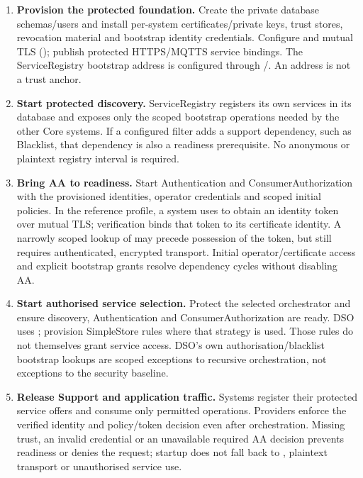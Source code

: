 \documentclass[a4paper]{arrowhead}
\newcommand{\svc}[1]{\textcolor{ArrowheadPurple}{\textit{\ahbreak{#1}}}}    %
\begin{document}
\begin{enumerate}
  \item \textbf{Provision the protected foundation.} Create the private database
        schemas/users and install per-system certificates/private keys, trust stores,
        revocation material and bootstrap identity credentials. Configure
         and mutual TLS
        (); publish protected HTTPS/MQTTS service
        bindings. The ServiceRegistry bootstrap address is configured through
        /. An address is not a trust anchor.
  \item \textbf{Start protected discovery.} ServiceRegistry registers its own services
        in its database and exposes only the scoped bootstrap operations needed by
        the other Core systems. If a configured filter adds a support dependency,
        such as Blacklist, that dependency is also a readiness prerequisite.
        No anonymous or plaintext registry interval is required.
  \item \textbf{Bring AA to readiness.} Start Authentication and ConsumerAuthorization
        with the provisioned identities, operator credentials and scoped initial
        policies. In the reference  profile, a system uses
         to obtain an identity token over mutual TLS;
        verification binds that token to its certificate identity. A narrowly scoped
        lookup of \svc{identity} may precede possession of the token, but still requires
        authenticated, encrypted transport. Initial operator/certificate access and
        explicit bootstrap grants resolve dependency cycles without disabling AA.
  \item \textbf{Start authorised service selection.} Protect the selected orchestrator
        and ensure discovery, Authentication and ConsumerAuthorization are ready.
        DSO uses ; provision SimpleStore rules where
        that strategy is used. Those rules do not themselves grant service access. DSO's
        own authorisation/blacklist bootstrap lookups are scoped exceptions to
        recursive orchestration, not exceptions to the security baseline.
  \item \textbf{Release Support and application traffic.} Systems register their
        protected service offers and consume only permitted operations. Providers
        enforce the verified identity and policy/token decision even after
        orchestration. Missing trust, an invalid credential or an unavailable required
        AA decision prevents readiness or denies the request; startup does not fall
        back to , plaintext transport or unauthorised service use.
\end{enumerate}
\end{document}
